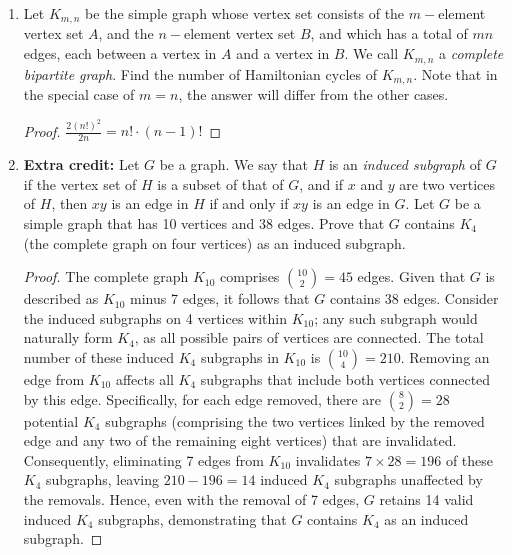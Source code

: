 \documentclass[11pt]{article}
\begin{document}
\begin{enumerate}
        \begin{proof}
            \begin{enumerate}
                \item[a.] $n!$
                \item[b.] $2n$
                \item[c.] $2$
                \item[d.] $(n - 1)!$
            \end{enumerate}
        \end{proof}

    \item Let $K_{m,n}$ be the simple graph whose vertex set consists of the $m-$element vertex set $A$, and the $n-$element vertex set $B$, and which has a total of $mn$ edges, each between a vertex in $A$ and a vertex in $B$. We call $K_{m,n}$ a \emph{complete bipartite graph}. Find the number of Hamiltonian cycles of $K_{m,n}$. Note that in the special case of $m=n$, the answer will differ from the other cases.

        \begin{proof}
            $\frac{2(n!)^2}{2n} = n! \cdot (n - 1)!$
        \end{proof}

    \item {\bf Extra credit:} Let $G$ be a graph. We say that $H$ is an \emph{induced subgraph} of $G$ if the vertex set of $H$ is a subset of that of $G$, and if $x$ and $y$ are two vertices of $H$, then $xy$ is an edge in $H$ if and only if $xy$ is an edge in $G$. Let $G$ be a simple graph that has 10 vertices and 38 edges. Prove that $G$ contains $K_4$ (the complete graph on four vertices) as an induced subgraph.

        \begin{proof}
            The complete graph \(K_{10}\) comprises \({10 \choose 2} = 45\) edges. Given that \(G\) is described as \(K_{10}\) minus 7 edges, it follows that \(G\) contains 38 edges. Consider the induced subgraphs on 4 vertices within \(K_{10}\); any such subgraph would naturally form \(K_4\), as all possible pairs of vertices are connected. The total number of these induced \(K_4\) subgraphs in \(K_{10}\) is \({10 \choose 4} = 210\). Removing an edge from \(K_{10}\) affects all \(K_4\) subgraphs that include both vertices connected by this edge. Specifically, for each edge removed, there are \({8 \choose 2} = 28\) potential \(K_4\) subgraphs (comprising the two vertices linked by the removed edge and any two of the remaining eight vertices) that are invalidated. Consequently, eliminating 7 edges from \(K_{10}\) invalidates \(7 \times 28 = 196\) of these \(K_4\) subgraphs, leaving \(210 - 196 = 14\) induced \(K_4\) subgraphs unaffected by the removals. Hence, even with the removal of 7 edges, \(G\) retains 14 valid induced \(K_4\) subgraphs, demonstrating that \(G\) contains \(K_4\) as an induced subgraph.
        \end{proof}


\end{enumerate}
\end{document}
